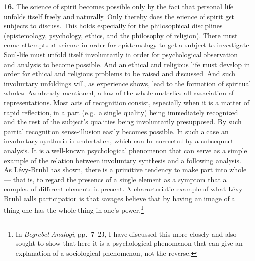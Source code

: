 \documentclass[12pt]{book}
\newcommand{\hnum}[1]{\textbf{#1.}\enspace}
\newcommand{\opage}[1]{\marginnote{\footnotesize\textit{[#1]}}}
\begin{document}
\opage{48}\hnum{16} The science of spirit becomes possible only by the fact that personal life unfolds itself
freely and naturally. Only thereby does the science of spirit get subjects to discuss. This holds
especially for the philosophical disciplines (epistemology, psychology, ethics, and the philosophy of
religion). There must come attempts at science in order for epistemology to get a subject to
investigate. Soul-life must unfold itself involuntarily in order for psychological observation and
analysis to become possible. And an ethical and religious life must develop in order for ethical and
religious problems to be raised and discussed. And such involuntary unfoldings will, as experience
shows, lead to the formation of spiritual wholes. As already mentioned, a law of the whole underlies
all association of representations. Most acts of recognition consist, especially when it is a matter of
rapid reflection, in a part (e.g.\ a single quality) being immediately recognized and the rest of the
subject's qualities being involuntarily presupposed. By such partial recognition sense-illusion easily
becomes possible. In such a case an involuntary synthesis is undertaken, which can be corrected by a
subsequent analysis. It is a well-known psychological phenomenon that can serve as a simple example of
the relation between involuntary synthesis and a following analysis. As Lévy-Bruhl has shown, there is
a primitive tendency to make part into whole --- that is, to regard the presence of a single element as
a symptom that a complex of \opage{49}different elements is present. A characteristic example of what Lévy-Bruhl
calls participation is that savages believe that by having an image of a thing one has the whole thing
in one's power.\footnote{In \textit{Begrebet Analogi}, pp.\ 7--23, I have discussed this more closely
and also sought to show that here it is a psychological phenomenon that can give an explanation of a
sociological phenomenon, not the reverse.}
\end{document}
